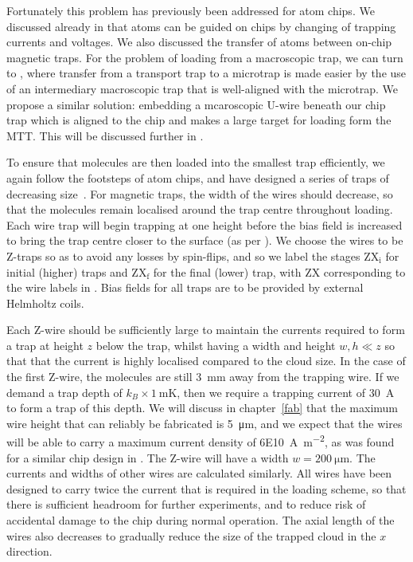 Fortunately this problem has previously been addressed for atom chips. We
discussed already in  that atoms can be guided on chips by
changing of trapping currents and voltages. We also discussed the transfer of
atoms between on-chip magnetic traps. For the problem of loading from a
macroscopic trap, we can turn to , where transfer from a
transport trap to a microtrap is made easier by the use of an intermediary
macroscopic trap that is well-aligned with the microtrap.
We propose a similar solution: embedding a mcaroscopic U-wire beneath our chip
trap which is aligned to the chip and makes a large target for loading form the
MTT.  This will be discussed further in .

To ensure that molecules are then loaded into the smallest trap efficiently, we
again follow the footsteps of atom chips, and have designed  a series of traps
of decreasing size~\cite{Reichel1999}. For magnetic traps, the width of the
wires should decrease, so that the molecules remain localised around
the trap centre throughout loading. 
%
Each wire trap will begin trapping at one height before the bias field is
increased to bring the trap centre closer to the surface (as per
). We choose the wires to be Z-traps so as to avoid
any losses by spin-flips, and so we label the stages $\mathrm{ZX_i}$ for
initial (higher) traps and $\mathrm{ZX_f}$ for the final (lower) trap, with
$\mathrm{ZX}$ corresponding to the wire labels in
. Bias fields for all traps are to be provided
by external Helmholtz coils.

Each Z-wire should be sufficiently large to maintain the currents required to
form a trap at height $z$ below the trap, whilst having a width and height  $w,
h \ll z$ so that that the current is highly localised compared to the cloud
size.
%
In the case of the first Z-wire, the molecules are still \SI{3}{\milli\meter}
away from the trapping wire. If we demand a trap depth of
$k_B\times\SI{1}{\milli\kelvin}$, then we require a trapping current of
\SI{30}{\ampere} to form a trap of this depth.  We will discuss in
chapter~\ref{fab} that the maximum wire height that can reliably be fabricated
is \SI{5}{\micro\meter}, and we expect that the wires will be able to carry a
maximum current density of \SI{6E10}{\ampere\per\meter\squared}, as was found
for a similar chip design in . The Z-wire will
have a width $w=\SI{200}{\micro\meter}$. The currents and widths of other wires
are calculated similarly.
%
All wires have been designed to
carry twice the current that is required in the loading scheme, so that there
is sufficient headroom for further experiments, and to reduce risk of
accidental damage to the chip during normal operation.
%
The axial length of the wires also decreases to gradually reduce the size of
the trapped cloud in the $x$ direction.  

